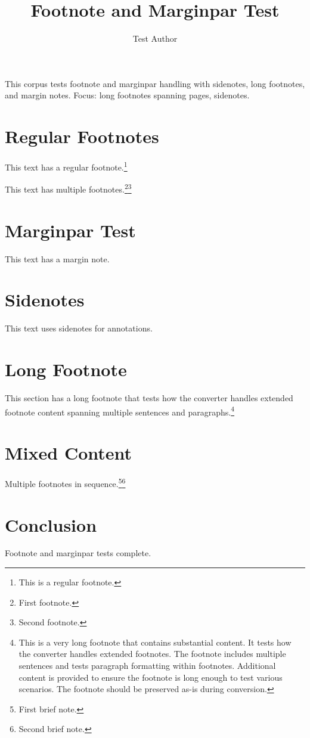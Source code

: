 \documentclass{article}
\title{Footnote and Marginpar Test}
\author{Test Author}
\begin{document}
\maketitle

\begin{abstrct}
This corpus tests footnote and marginpar handling with sidenotes, long footnotes,
and margin notes.
Focus: long footnotes spanning pages, sidenotes.
\end{abstrct}

\section{Regular Footnotes}

This text has a regular footnote.\footnote{This is a regular footnote.}

This text has multiple footnotes.\footnote{First footnote.}\footnote{Second footnote.}

\section{Marginpar Test}

This text has a margin note.

\section{Sidenotes}

This text uses sidenotes for annotations.

\section{Long Footnote}

This section has a long footnote that tests how the converter handles
extended footnote content spanning multiple sentences and paragraphs.\footnote{This is a very long footnote that contains substantial content. It tests how the converter handles extended footnotes. The footnote includes multiple sentences and tests paragraph formatting within footnotes. Additional content is provided to ensure the footnote is long enough to test various scenarios. The footnote should be preserved as-is during conversion.}

\section{Mixed Content}

Multiple footnotes in sequence.\footnote{First brief note.}\footnote{Second brief note.}

\section{Conclusion}

Footnote and marginpar tests complete.
\end{document}
